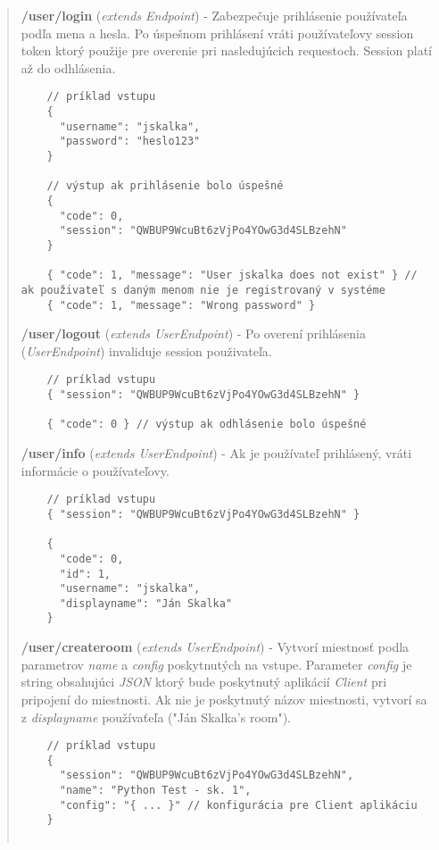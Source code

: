 \documentclass{article}
\newcommand{\filedesc}[1]{\vspace{0.3cm} \noindent \textbf{#1}}
\begin{document}
\begin{quote}
  \filedesc{/user/login} (\emph{extends Endpoint}) - Zabezpečuje prihlásenie používateľa podľa mena a hesla. Po úspešnom prihlásení vráti používateľovy session token ktorý použije pre overenie pri nasledujúcich requestoch. Session platí až do odhlásenia.
  \begin{verbatim}
    // príklad vstupu
    {
      "username": "jskalka",
      "password": "heslo123"
    } 

    // výstup ak prihlásenie bolo úspešné
    {
      "code": 0,
      "session": "QWBUP9WcuBt6zVjPo4YOwG3d4SLBzehN"
    }

    { "code": 1, "message": "User jskalka does not exist" } // ak použivateľ s daným menom nie je registrovaný v systéme
    { "code": 1, "message": "Wrong password" }
  \end{verbatim}

  \filedesc{/user/logout} (\emph{extends UserEndpoint}) - Po overení prihlásenia (\emph{UserEndpoint}) invaliduje session použivateľa.

  \begin{verbatim}
    // príklad vstupu
    { "session": "QWBUP9WcuBt6zVjPo4YOwG3d4SLBzehN" } 

    { "code": 0 } // výstup ak odhlásenie bolo úspešné
  \end{verbatim}

  \filedesc{/user/info} (\emph{extends UserEndpoint}) - Ak je používateľ prihlásený, vráti informácie o používateľovy.

  \begin{verbatim}
    // príklad vstupu
    { "session": "QWBUP9WcuBt6zVjPo4YOwG3d4SLBzehN" } 

    {
      "code": 0,
      "id": 1,
      "username": "jskalka",
      "displayname": "Ján Skalka"
    }
  \end{verbatim}

  \filedesc{/user/createroom} (\emph{extends UserEndpoint}) - Vytvorí miestnosť podla parametrov \emph{name} a \emph{config} poskytnutých na vstupe. Parameter \emph{config} je string obsahujúci \emph{JSON} ktorý bude poskytnutý aplikácií \emph{Client} pri pripojení do miestnosti. Ak nie je poskytnutý názov miestnosti, vytvorí sa z \emph{displayname} používaťeľa ("Ján Skalka's room").

  \begin{verbatim}
    // príklad vstupu
    {
      "session": "QWBUP9WcuBt6zVjPo4YOwG3d4SLBzehN",
      "name": "Python Test - sk. 1",
      "config": "{ ... }" // konfigurácia pre Client aplikáciu
    }


\end{verbatim}
\end{quote}
\end{document}
